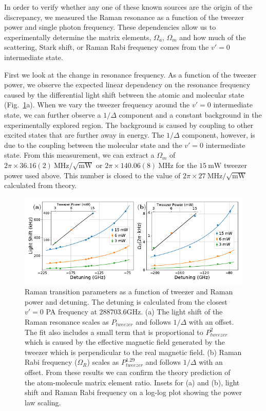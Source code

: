 \documentclass[aps,prl,twocolumn,superscriptaddress]{revtex4-1}
\newcommand{\todo}[1]{}
\begin{document}
In order to verify whether any one of these known sources are the origin of the discrepancy,
we measured the Raman resonance as a function of the tweezer power and single photon frequency.
These dependencies allow us to experimentally determine the matrix elements,
$ \Omega_a $, $\Omega_m $ and how much of the scattering, Stark shift,
or Raman Rabi frequency comes from the $ v' = 0$ intermediate state.

First we look at the change in resonance frequency.
As a function of the tweezer power,
we observe the expected linear dependency on the resonance frequency
caused by the differential light shift between the atomic and molecular state (Fig.~\ref{f-det}a).
When we vary the tweezer frequency around the $v'=0$ intermediate state,
we can further observe a $1/\Delta$ component
and a constant background in the experimentally explored region.
The background is caused by coupling to other excited states that are further away in energy.
The $1/\Delta$ component, however, is due to the coupling between the molecular state
and the $v'=0$ intermediate state.
From this measurement, we can extract a $\Omega_m$ of
$2\pi\times36.16(2) ~\mathrm{MHz}/\sqrt{\mathrm{mW}}$ or
$2\pi\times140.06(8) ~\mathrm{MHz}$ for the $15 ~\mathrm{mW}$ tweezer power used above.
This number is closed to the value of
$2\pi\times27 ~\mathrm{MHz}/\sqrt{\mathrm{mW}}$ calculated from theory. \todo{ref/sm theory}

\begin{figure}
  \includegraphics[width=\textwidth]{fig4.pdf}
  \caption{Raman transition parameters as a function of tweezer and Raman power and detuning.
    The detuning is calculated from the closest $v'=0$ PA frequency at $288703.6\mathrm{GHz}$.
    (a) The light shift of the Raman resonance scales as $P_{tweezer}$
    and follows $1/\Delta$ with an offset.
    The fit also includes a small term that is proportional to $P_{tweezer}^2$
    which is caused by the effective magnetic field generated by the tweezer which is
    perpendicular to the real magnetic field.
    (b) Raman Rabi frequency ($\Omega_R$) scales as $P_{tweezer}^{1.29}$
    and follows $1/\Delta$ with an offset.
    From these results we can confirm the theory prediction of
    the atom-molecule matrix element ratio.
    Insets for (a) and (b), light shift and Raman Rabi frequency on a log-log plot
    showing the power law scaling.
    \label{f-det}}
\end{figure}
\end{document}
